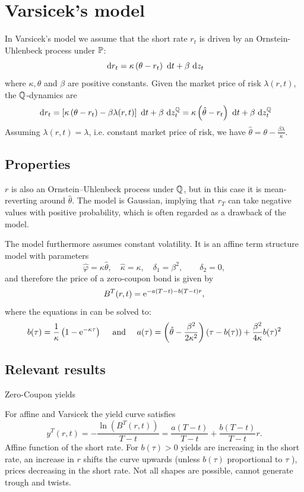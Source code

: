\section{Varsicek's model}
In Varsicek's model we assume that the short rate $r_{t}$ is driven by an Ornstein-Uhlenbeck process
under $\P$:
\[
\d r_{t}=\kappa\left(\theta-r_{t}\right) \d t+\beta \d z_{t}
\]
where $\kappa, \theta$ and $\beta$ are positive constants. Given the market price of risk
$\lambda(r, t)$, the $\Q$-dynamics are
\[
\d  r_{t}=\left[\kappa\left(\theta-r_{t}\right)-\beta \lambda(r, t)\right] \d t+\beta
\d  z_{t}^{\Q}=\kappa\left(\hat{\theta}-r_{t}\right) \d t+\beta \d 
z_{t}^{\Q}
\]
Assuming $\lambda(r, t)=\lambda$, i.e. constant market price of risk, we have
$\hat{\theta}=\theta-\frac{\beta \lambda}{\kappa}$.

\subsection{Properties}
$r$ is also an Ornstein–Uhlenbeck process under $\Q$, but in this case it is mean-reverting around
$\hat{\theta}$. The model is Gaussian, implying that $r_T$ can take negative values with positive
probability, which is often regarded as a drawback of the model.

The model furthermore assumes constant volatility. It is an affine term structure model with
parameters
\[
\hat{\varphi}=\kappa \hat{\theta}, \quad \hat{\kappa}=\kappa, \quad
\delta_1=\beta^2, \qquad \delta_2=0,
\]
and therefore the price of a zero-coupon bond is given by
\[
B^{T}(r, t)=\e^{-a(T-t)-b(T-t) r},
\]
where the equations in  can be solved to:
\[
b(\tau)=\frac{1}{\kappa}\left(1-\e^{-\kappa \tau}\right) \quad \text { and } \quad
a(\tau)=\left(\hat{\theta}-\frac{\beta^{2}}{2 \kappa^{2}}\right)(\tau-b(\tau))
+\frac{\beta^{2}}{4\kappa} b(\tau)^{2}
\]

\subsection{Relevant results}
\begin{description}
\item[Zero-Coupon yields] 
\end{description}
For affine and Varsicek the yield curve satisfies
\[
y^{T}(r, t)=-\frac{\ln \left(B^{T}(r, t)\right)}{T-t}=\frac{a(T-t)}{T-t}+\frac{b(T-t)}{T-t} r .
\]
Affine function of the short rate. For $b(\tau)>0$ yields are increasing in the short rate, an
increase in $r$ shifts the curve upwards (unless $b(\tau)$ proportional to $\tau$ ), prices
decreasing in the short rate. Not all shapes are possible, cannot generate trough and twists.

